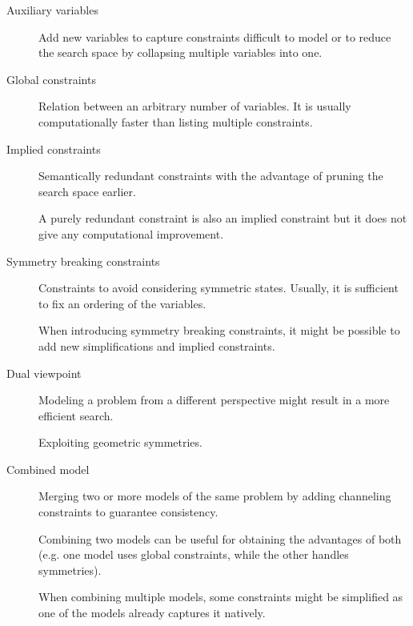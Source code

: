 \begin{description}
    \item[Auxiliary variables] 
        Add new variables to capture constraints difficult to model or 
        to reduce the search space by collapsing multiple variables into one. 


    \item[Global constraints] 
        Relation between an arbitrary number of variables.
        It is usually computationally faster than listing multiple constraints.


    \item[Implied constraints] 
        Semantically redundant constraints with the advantage of pruning the search space earlier.

        \begin{remark}
            A purely redundant constraint is also an implied constraint but it does not give any computational improvement.
        \end{remark}

        
    \item[Symmetry breaking constraints] 
        Constraints to avoid considering symmetric states. 
        Usually, it is sufficient to fix an ordering of the variables.

        \begin{remark}
            When introducing symmetry breaking constraints, 
            it might be possible to add new simplifications and implied constraints.
        \end{remark}

    
    \item[Dual viewpoint] 
        Modeling a problem from a different perspective might result in a more efficient search.
        \begin{example}
            Exploiting geometric symmetries.
        \end{example}


    \item[Combined model] 
        Merging two or more models of the same problem by adding channeling constraints to guarantee consistency.

        Combining two models can be useful for obtaining the advantages of both 
        (e.g. one model uses global constraints, while the other handles symmetries).

        \begin{remark}
            When combining multiple models, some constraints might be simplified as one of the models already captures it natively.
        \end{remark}
\end{description}
